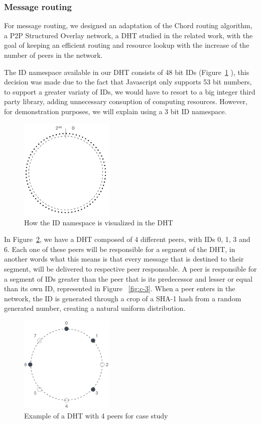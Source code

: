 \subsubsection{Message routing}

For message routing, we designed an adaptation of the Chord routing algorithm, a P2P Structured Overlay network, a DHT studied in the related work, with the goal of keeping an efficient routing and resource lookup with the increase of the number of peers in the network.

The ID namespace available in our DHT consists of 48 bit IDs (Figure~\ref{fig:c-1} ), this decision was made due to the fact that Javascript only supports 53 bit numbers, to support a greater variaty of IDs, we would have to resort to a big integer third party library, adding unnecessary consuption of computing resources. However, for demonstration purposes, we will explain using a 3 bit ID namespace.

\begin{figure}[h!]
  \centering
  \includegraphics[width=0.4\textwidth]{figs/chord-1}
  \caption{How the ID namespace is visualized in the DHT}
  \label{fig:c-1}
\end{figure}

In Figure~\ref{fig:c-2}, we have a DHT composed of 4 different peers, with IDs 0, 1, 3 and 6. Each one of these peers will be responsible for a segment of the DHT, in another words what this means is that every message that is destined to their segment, will be delivered to respective peer responsable. A peer is responsible for a segment of IDs greater than the peer that is its predecessor and lesser or equal than its own ID, represented in Figure ~\ref{fig:c-3}. When a peer enters in the network, the ID is generated through a crop of a SHA-1 hash from a random generated number, creating a natural uniform distribution.

\begin{figure}[h!]
  \centering
  \includegraphics[width=0.4\textwidth]{figs/chord-2}
  \caption{Example of a DHT with 4 peers for case study}
  \label{fig:c-2}
\end{figure}

